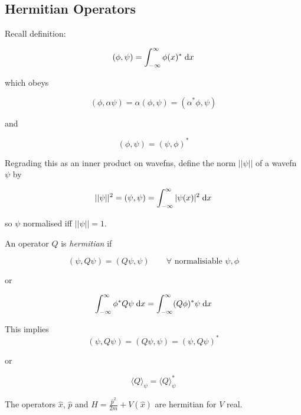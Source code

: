 \documentclass[a4paper]{article}
\begin{document}
\subsection{Hermitian Operators}

Recall definition:

\[ (\phi,\psi)  = \int_{-\infty}^{\infty} \phi(x)^{*} \; \mathrm{d} x \]

which obeys

\[ (\phi,\alpha \psi) = \alpha (\phi,\psi) = (\alpha^{*} \phi,\psi ) \]

and

\[ (\phi,\psi) = (\psi,\phi)^{*} \]

Regrading this as an inner product on wavefns, define the norm $ | | \psi | | $ of a wavefn $ \psi $ by

\[ | | \psi | |^{2} = (\psi,\psi) = \int_{-\infty}^{\infty} | \psi(x) |^{2} \; \mathrm{d} x \]

so $ \psi $ normalised iff $ | | \psi | | =1 $.

An operator $ Q $ is \emph{hermitian} if

\[ (\psi, Q \psi) = (Q \psi, \psi) \qquad \forall \text{ normalisiable } \psi, \phi \]

or 

\[ \int_{-\infty}^{\infty} \phi^{*} Q \psi \; \mathrm{d} x = \int_{-\infty}^{\infty} (Q \phi)^{*} \psi \; \mathrm{d} x \]

This implies 
\[ (\psi, Q \psi) = (Q \psi, \psi) = (\psi, Q \psi)^{*} \]

or

\[ \langle Q \rangle_{\psi} =  \langle Q \rangle_{\psi}^{*}\]

The operators $ \hat{x} $, $ \hat{p} $ and $ H  = \frac{\hat{p}^{2}}{2m} + V(\hat{x}) $ are hermitian for $ V $ real.
\end{document}
